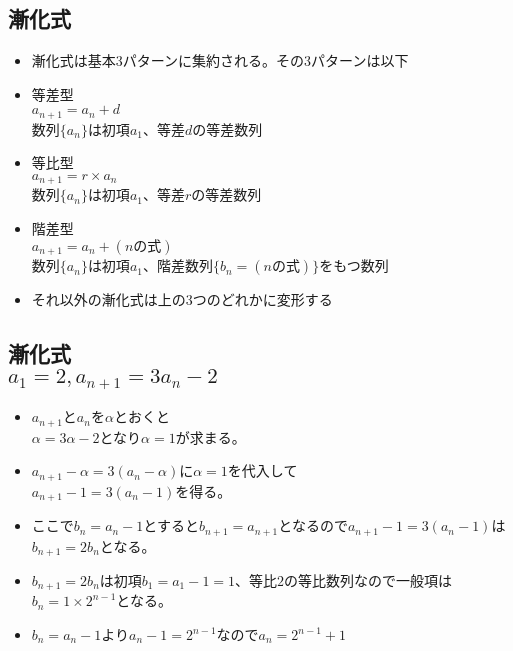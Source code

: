\documentclass[twocolumn, 25pt]{jarticle}
\begin{document}
\subsection{漸化式}
\begin{itemize}
  \item 漸化式は基本$3$パターンに集約される。その$3$パターンは以下
  \item {\LARGE 等差型 \\ $a_{n + 1} = a_n + d$ \\ 数列$\{a_n\}$は初項$a_1$、等差$d$の等差数列}
  \item {\LARGE 等比型 \\ $a_{n + 1} = r \times a_n$ \\ 数列$\{a_n\}$は初項$a_1$、等差$r$の等差数列}
  \item {\LARGE 階差型 \\ $a_{n + 1} = a_n + (nの式)$ \\ 数列$\{a_n\}$は初項$a_1$、階差数列$\{b_n = (nの式)\}$をもつ数列}
  \item それ以外の漸化式は上の$3$つのどれかに変形する
\end{itemize}
\subsection{漸化式\\ $a_1 = 2, a_{n + 1} = 3a_n - 2$}
\begin{itemize}
  \item $a_{n + 1}$と$a_n$を$\alpha$とおくと\\ $\alpha = 3\alpha - 2$となり$\alpha = 1$が求まる。
  \item $a_{n + 1} - \alpha = 3(a_n - \alpha)$に$\alpha = 1$を代入して\\ $a_{n + 1} - 1 = 3(a_n - 1)$を得る。
  \item ここで$b_n = a_n - 1$とすると$b_{n + 1} = a_{n + 1}$となるので$a_{n + 1} - 1 = 3(a_n - 1)$は$b_{n + 1} = 2b_n$となる。
  \item $b_{n + 1} = 2b_n$は初項$b_1 = a_1 - 1 = 1$、等比$2$の等比数列なので一般項は$b_n = 1 \times 2^{n - 1}$となる。
  \item $b_n = a_n - 1$より$a_n - 1 = 2^{n - 1}$なので$a_n = 2^{n - 1} + 1$
\end{itemize}
\end{document}

